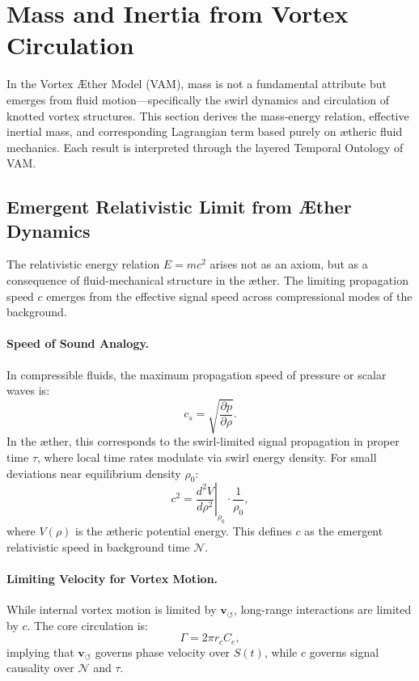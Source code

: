 \section{Mass and Inertia from Vortex Circulation}

In the Vortex \AE{}ther Model (VAM), mass is not a fundamental attribute but emerges from fluid motion—specifically the swirl dynamics and circulation of knotted vortex structures. This section derives the mass-energy relation, effective inertial mass, and corresponding Lagrangian term based purely on \ae{}theric fluid mechanics. Each result is interpreted through the layered Temporal Ontology of VAM.

\subsection{Emergent Relativistic Limit from \AE{}ther Dynamics}

The relativistic energy relation \( E = mc^2 \) arises not as an axiom, but as a consequence of fluid-mechanical structure in the \ae{}ther. The limiting propagation speed \( c \) emerges from the effective signal speed across compressional modes of the background.

\paragraph{Speed of Sound Analogy.}
In compressible fluids, the maximum propagation speed of pressure or scalar waves is:
\[
    c_s = \sqrt{\frac{\partial p}{\partial \rho}}.
\]
In the \ae{}ther, this corresponds to the swirl-limited signal propagation in proper time \( \tau \), where local time rates modulate via swirl energy density. For small deviations near equilibrium density \( \rho_0 \):
\[
    c^2 = \left.\frac{d^2 V}{d\rho^2} \right|_{\rho_0} \cdot \frac{1}{\rho_0},
\]
where \( V(\rho) \) is the \ae{}theric potential energy. This defines \( c \) as the emergent relativistic speed in background time \( \mathcal{N} \).

\paragraph{Limiting Velocity for Vortex Motion.}
While internal vortex motion is limited by \( \mathbf{v}_{\scriptscriptstyle\boldsymbol{\circlearrowleft}} \), long-range interactions are limited by \( c \). The core circulation is:
\[
    \Gamma = 2\pi r_c C_e,
\]
implying that \( \mathbf{v}_{\scriptscriptstyle\boldsymbol{\circlearrowleft}} \) governs phase velocity over $S(t)$, while \( c \) governs signal causality over $\mathcal{N}$ and $\tau$.

